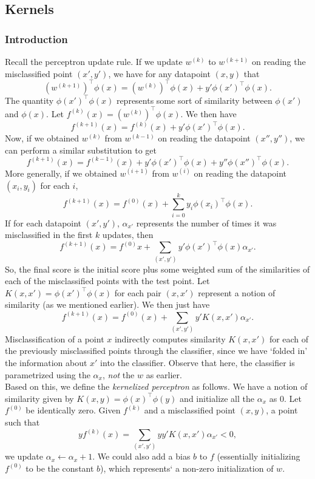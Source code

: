 \documentclass{article}
\begin{document}
	\subsection{Kernels}

		\subsubsection{Introduction}

			Recall the perceptron update rule. If we update $w^{(k)}$ to $w^{(k+1)}$ on reading the misclassified point $(x',y')$, we have for any datapoint $(x,y)$ that
			\[ (w^{(k+1)})^\top\phi(x) = (w^{(k)})^\top \phi(x) + y' \phi(x')^\top \phi(x). \]
			The quantity $\phi(x')^\top\phi(x)$ represents some sort of similarity between $\phi(x')$ and $\phi(x)$. Let $f^{(k)}(x) = (w^{(k)})^\top\phi(x)$. We then have
			\[ f^{(k+1)}(x) = f^{(k)}(x) + y'\phi(x')^\top\phi(x). \]
			Now, if we obtained $w^{(k)}$ from $w^{(k-1)}$ on reading the datapoint $(x'',y'')$, we can perform a similar substitution to get
			\[ f^{(k+1)}(x) = f^{(k-1)}(x) + y'\phi(x')^\top\phi(x) + y''\phi(x'')^\top\phi(x). \]
			More generally, if we obtained $w^{(i+1)}$ from $w^{(i)}$ on reading the datapoint $(x_i,y_i)$ for each $i$,
			\[ f^{(k+1)}(x) = f^{(0)}(x) + \sum_{i=0}^{k} y_i\phi(x_i)^\top\phi(x). \]
			If for each datapoint $(x',y')$, $\alpha_{x'}$ represents the number of times it was misclassified in the first $k$ updates, then
			\[ f^{(k+1)}(x) = f^{(0)}x + \sum_{(x',y')} y'\phi(x')^\top\phi(x) \alpha_{x'}. \]
			So, the final score is the initial score plus some weighted sum of the similarities of each of the misclassified points with the test point. Let $K(x,x') = \phi(x')^\top\phi(x)$ for each pair $(x,x')$ represent a notion of similarity (as we mentioned earlier). We then just have
			\[ f^{(k+1)}(x) = f^{(0)}(x) + \sum_{(x',y')} y' K(x,x') \alpha_{x'}. \]
			Misclassification of a point $x$ indirectly computes similarity $K(x,x')$ for each of the previously misclassified points through the classifier, since we have `folded in' the information about $x'$ into the classifier. Observe that here, the classifier is parametrized using the $\alpha_{x}$, \emph{not} the $w$ as earlier.\\

			Based on this, we define the \emph{kernelized perceptron} as follows. We have a notion of similarity given by $K(x,y) = \phi(x)^\top\phi(y)$ and initialize all the $\alpha_x$ as $0$. Let $f^{(0)}$ be identically zero. Given $f^{(k)}$ and a misclassified point $(x,y)$, a point such that
			\[ y f^{(k)}(x) = \sum_{(x',y')} yy' K(x,x') \alpha_{x'} < 0, \]
			we update $\alpha_x \gets \alpha_x + 1$. We could also add a bias $b$ to $f$ (essentially initializing $f^{(0)}$ to be the constant $b$), which represents` a non-zero initialization of $w$.\\
\end{document}
